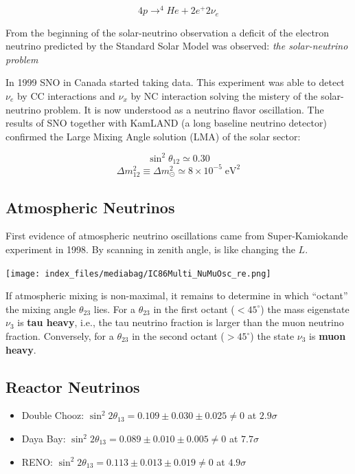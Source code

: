 \documentclass[
  letterpaper,
  DIV=11,
  numbers=noendperiod]{scrreprt}
\providecommand{\tightlist}{%
  \setlength{\itemsep}{0pt}\setlength{\parskip}{0pt}}\usepackage{longtable,booktabs,array}
\begin{document}
\[4p \rightarrow ^4He + 2e^+ 2\nu_e\]

From the beginning of the solar-neutrino observation a deficit of the
electron neutrino predicted by the Standard Solar Model was observed:
\emph{the solar-neutrino problem}

In 1999 SNO in Canada started taking data. This experiment was able to
detect \(\nu_e\) by CC interactions and \(\nu_x\) by NC interaction
solving the mistery of the solar-neutrino problem. It is now understood
as a neutrino flavor oscillation. The results of SNO together with
KamLAND (a long baseline neutrino detector) confirmed the Large Mixing
Angle solution (LMA) of the solar sector:

\[\sin^2 \theta_{12} \simeq 0.30\]
\[\Delta m_{12}^2 \equiv \Delta m_{\odot}^2 \simeq 8 \times 10^{-5} \mathrm{ \; eV^2}\]

\subsection{Atmospheric Neutrinos}\label{atmospheric-neutrinos}

First evidence of atmospheric neutrino oscillations came from
Super-Kamiokande experiment in 1998. By scanning in zenith angle, is
like changing the \(L\).

\texttt{[image: index\_files/mediabag/IC86Multi\_NuMuOsc\_re.png]}

If atmospheric mixing is non-maximal, it remains to determine in which
``octant'' the mixing angle \(\theta_{23}\) lies. For a \(\theta_{23}\)
in the first octant (\(< 45^{\circ}\)) the mass eigenstate \(\nu_3\) is
\textbf{tau heavy}, i.e., the tau neutrino fraction is larger than the
muon neutrino fraction. Conversely, for a \(\theta_{23}\) in the second
octant (\(> 45^{\circ}\)) the state \(\nu_3\) is \textbf{muon heavy}.

\subsection{Reactor Neutrinos}\label{reactor-neutrinos}

\begin{itemize}
\tightlist
\item
  Double Chooz:
  \(\sin^2 2\theta_{13} = 0.109 \pm 0.030 \pm 0.025 \neq 0\) at
  \(2.9\sigma\)
\item
  Daya Bay: \(\sin^2 2\theta_{13} = 0.089 \pm 0.010 \pm 0.005 \neq 0\)
  at \(7.7\sigma\)
\item
  RENO: \(\sin^2 2\theta_{13} = 0.113 \pm 0.013 \pm 0.019 \neq 0\) at
  \(4.9\sigma\)
\end{itemize}
\end{document}
